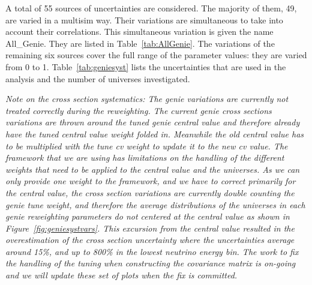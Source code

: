 \documentclass[a4paper]{article}
\begin{document}
A total of 55 sources of uncertainties are considered. The majority of them, 49, are varied in a multisim way. Their variations are simultaneous to take into account their correlations. This simultaneous variation is given the name All\_Genie. They are listed in Table~\ref{tab:AllGenie}. The variations of the remaining six sources cover the full range of the parameter values: they are varied from 0 to 1. Table~\ref{tab:geniesyst} lists the uncertainties that are used in the analysis and the number of universes investigated.

\textit{Note on the cross section systematics: The genie variations are currently not treated correctly during the reweighting. The current genie cross sections variations are thrown around the tuned genie central value and therefore already have the tuned central value weight folded in. Meanwhile the old central value has to be multiplied with the tune cv weight to update it to the new cv value. The framework that we are using has limitations on the handling of the different weights that need to be applied to the central value and the universes. As we can only provide one weight to the framework, and we have to correct primarily for the central value, the cross section variations are currently double counting the genie tune weight, and therefore the average distributions of the universes in each genie reweighting parameters do not centered at the central value as shown in Figure~\ref{fig:geniesystvars}. This excursion from the central value resulted in the overestimation of the cross section uncertainty where the uncertainties average around 15\%, and up to 800\% in the lowest neutrino energy bin. 
The work to fix the handling of the tuning when constructing the covariance matrix is on-going and we will update these set of plots when the fix is committed.}
\end{document}
